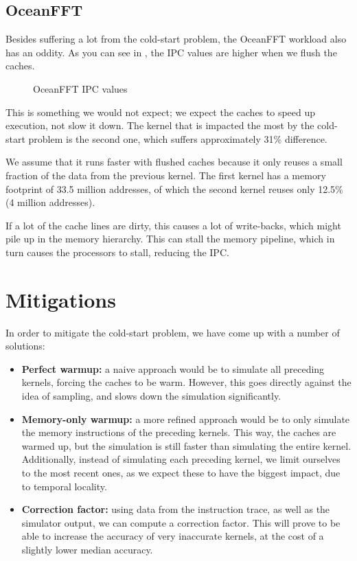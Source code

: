 \documentclass[5p,numvwe]{elsarticle}
\begin{document}
    \subsection{OceanFFT}\label{subsec:oceanfft}
    Besides suffering a lot from the cold-start problem, the OceanFFT workload also has an oddity.
    As you can see in , the IPC values are higher when we flush the caches.

    \begin{figure}[ht]
        \centering
        \caption{OceanFFT IPC values}
        \label{fig:sim-ocean}
    \end{figure}

    This is something we would not expect; we expect the caches to speed up execution, not slow it down.
    The kernel that is impacted the most by the cold-start problem is the second one, which suffers approximately 31\% difference.

    We assume that it runs faster with flushed caches because it only reuses a small fraction of the data from the previous kernel.
    The first kernel has a memory footprint of 33.5 million addresses, of which the second kernel reuses only 12.5\% (4 million addresses).

    If a lot of the cache lines are dirty, this causes a lot of write-backs, which might pile up in the memory hierarchy.
    This can stall the memory pipeline, which in turn causes the processors to stall, reducing the IPC\@.

    \section{Mitigations}\label{sec:mitig}
    In order to mitigate the cold-start problem, we have come up with a number of solutions:
    \begin{itemize}
        \item \textbf{Perfect warmup:} a naive approach would be to simulate all preceding kernels, forcing the caches to be warm.
        However, this goes directly against the idea of sampling, and slows down the simulation significantly.
        \item \textbf{Memory-only warmup:} a more refined approach would be to only simulate the memory instructions of the preceding kernels.
        This way, the caches are warmed up, but the simulation is still faster than simulating the entire kernel.
        Additionally, instead of simulating each preceding kernel, we limit ourselves to the most recent ones, as we expect these to have the biggest impact, due to temporal locality.
        \item \textbf{Correction factor:} using data from the instruction trace, as well as the simulator output, we can compute a correction factor.
        This will prove to be able to increase the accuracy of very inaccurate kernels, at the cost of a slightly lower median accuracy.
    \end{itemize}
\end{document}
